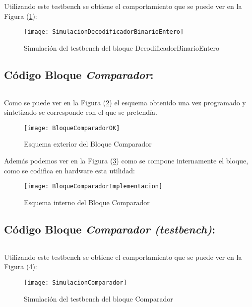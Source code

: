     Utilizando este testbench se obtiene el comportamiento que se puede ver en la Figura (\ref{fig:SimulacionDecodificadorBinarioEntero}):

    \begin{figure}[H]
		    \centering
		    \texttt{[image: SimulacionDecodificadorBinarioEntero]}
		    \caption{Simulación del testbench del bloque DecodificadorBinarioEntero}
		    \label{fig:SimulacionDecodificadorBinarioEntero}
	\end{figure}

\subsection{Código Bloque \textit{Comparador}:} \label{code:Comparador}
    \inputminted[frame=lines,fontsize=\footnotesize,linenos]{vhdl}{CodeFiles/Comparador.vhd}	

	Como se puede ver en la Figura (\ref{fig:BloqueComparadorOK}) el esquema obtenido una vez programado y sintetizado se corresponde con el que se pretendía.
    \begin{figure}[H]
		    \centering
		    \texttt{[image: BloqueComparadorOK]}
		    \caption{Esquema exterior del Bloque Comparador}
		    \label{fig:BloqueComparadorOK}
	\end{figure}
    Además podemos ver en la Figura (\ref{fig:BloqueComparadorImplementacion}) como se compone internamente el bloque, como se codifica en hardware esta utilidad:
    \begin{figure}[H]
		    \centering
		    \texttt{[image: BloqueComparadorImplementacion]}
		    \caption{Esquema interno del Bloque Comparador}
		    \label{fig:BloqueComparadorImplementacion}
	\end{figure}

\subsection{Código Bloque \textit{Comparador (testbench)}:} \label{code:Comparador_tb}
    \inputminted[frame=lines,fontsize=\footnotesize,linenos]{vhdl}{CodeFiles/Comparador_tb.vhd}

    Utilizando este testbench se obtiene el comportamiento que se puede ver en la Figura (\ref{fig:SimulacionComparador}):

    \begin{figure}[H]
		    \centering
		    \texttt{[image: SimulacionComparador]}
		    \caption{Simulación del testbench del bloque Comparador}
		    \label{fig:SimulacionComparador}
	\end{figure}

